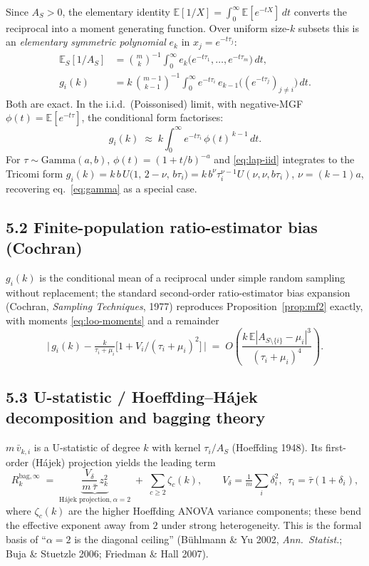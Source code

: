 \documentclass[11pt]{article}
\newcommand{\E}{\mathbb{E}}
\newcommand{\Rk}{R_k^{\mathrm{bag},\infty}}
\begin{document}
Since $A_S>0$, the elementary identity $\E[1/X]=\int_0^\infty\E[e^{-tX}]\,dt$ converts the
reciprocal into a moment generating function. Over uniform size-$k$ subsets this is an
\emph{elementary symmetric polynomial} $e_k$ in $x_j=e^{-t\tau_j}$:
\begin{align}
  \E_S[1/A_S]
  &= \binom{m}{k}^{-1}\!\int_0^\infty e_k\!\big(e^{-t\tau_1},\dots,e^{-t\tau_m}\big)\,dt,
  \label{eq:lap-uncond}\\[2pt]
  g_i(k)
  &= k\,\binom{m-1}{k-1}^{-1}\!\int_0^\infty e^{-t\tau_i}\,
     e_{k-1}\!\big((e^{-t\tau_j})_{j\neq i}\big)\,dt .
  \label{eq:lap-cond}
\end{align}
Both are exact. In the i.i.d.\ (Poissonised) limit, with negative-MGF
$\phi(t)=\E[e^{-t\tau}]$, the conditional form factorises:
\begin{equation}\label{eq:lap-iid}
  g_i(k)\;\approx\;k\int_0^\infty e^{-t\tau_i}\,\phi(t)^{\,k-1}\,dt .
\end{equation}
For $\tau\sim\mathrm{Gamma}(a,b)$, $\phi(t)=(1+t/b)^{-a}$ and \eqref{eq:lap-iid} integrates to
the Tricomi form $g_i(k)=k\,b\,U\!\big(1,\,2-\nu,\,b\tau_i\big)=k\,b^{\nu}\tau_i^{\nu-1}U(\nu,\nu,b\tau_i)$,
$\nu=(k-1)a$, recovering eq.~\eqref{eq:gamma} as a special case.

\subsection*{5.2 Finite-population ratio-estimator bias (Cochran)}

$g_i(k)$ is the conditional mean of a reciprocal under simple random sampling without
replacement; the standard second-order ratio-estimator bias expansion
(Cochran, \emph{Sampling Techniques}, 1977) reproduces Proposition~\ref{prop:mf2}
exactly, with moments \eqref{eq:loo-moments} and a remainder
\begin{equation}\label{eq:cochran-rem}
  \Big|\,g_i(k)-\tfrac{k}{\tau_i+\mu_i}\big[1+V_i/(\tau_i+\mu_i)^2\big]\,\Big|
  \;=\;O\!\left(\frac{k\,\E|A_{S\setminus\{i\}}-\mu_i|^3}{(\tau_i+\mu_i)^4}\right).
\end{equation}

\subsection*{5.3 U-statistic / Hoeffding--H\'ajek decomposition and bagging theory}

$m\,\bar v_{k,i}$ is a U-statistic of degree $k$ with kernel $\tau_i/A_S$
(Hoeffding 1948). Its first-order (H\'ajek) projection yields the leading term
\begin{equation}\label{eq:hajek}
  \Rk \;=\; \underbrace{\frac{V_\delta}{m\,\bar\tau}\,z_k^2}_{\text{H\'ajek projection,}\ \alpha=2}
  \;+\;\sum_{c\geq 2}\zeta_c(k),
  \qquad V_\delta=\tfrac1m\textstyle\sum_i\delta_i^2,\ \ \tau_i=\bar\tau(1+\delta_i),
\end{equation}
where $\zeta_c(k)$ are the higher Hoeffding ANOVA variance components; these bend the
effective exponent away from $2$ under strong heterogeneity. This is the formal basis of
``$\alpha=2$ is the diagonal ceiling'' (Bühlmann \& Yu 2002, \emph{Ann.\ Statist.};
Buja \& Stuetzle 2006; Friedman \& Hall 2007).
\end{document}
